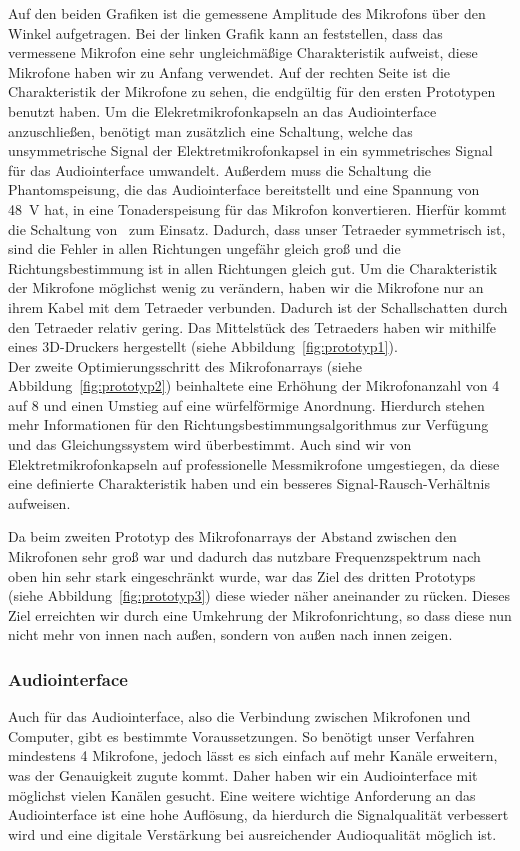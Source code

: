 Auf den beiden Grafiken ist die gemessene Amplitude des Mikrofons über den Winkel aufgetragen. Bei der linken Grafik kann an feststellen, dass das vermessene Mikrofon eine sehr ungleichmäßige Charakteristik aufweist, diese Mikrofone haben wir zu Anfang verwendet. Auf der rechten Seite ist die Charakteristik der Mikrofone zu sehen, die endgültig für den ersten Prototypen benutzt haben. Um die Elekretmikrofonkapseln an das Audiointerface anzuschließen, benötigt man zusätzlich eine Schaltung, welche das unsymmetrische Signal der Elektretmikrofonkapsel in ein symmetrisches Signal für das Audiointerface umwandelt. Außerdem muss die Schaltung die Phantomspeisung, die das Audiointerface bereitstellt und eine Spannung von \SI{48}{\volt} hat, in eine Tonaderspeisung für das Mikrofon konvertieren. Hierfür kommt die Schaltung von~\cite{Powering_microphones} zum Einsatz.
Dadurch, dass unser Tetraeder symmetrisch ist, sind die Fehler in allen Richtungen ungefähr gleich groß und die Richtungsbestimmung ist in allen Richtungen gleich gut. Um die Charakteristik der Mikrofone möglichst wenig zu verändern, haben wir die Mikrofone nur an ihrem Kabel mit dem Tetraeder verbunden. Dadurch ist der Schallschatten durch den Tetraeder relativ gering. Das Mittelstück des Tetraeders haben wir mithilfe eines 3D-Druckers hergestellt (siehe Abbildung~\ref{fig:prototyp1}).\\

Der zweite Optimierungsschritt des Mikrofonarrays (siehe Abbildung~\ref{fig:prototyp2}) beinhaltete eine Erhöhung der Mikrofonanzahl von \num{4} auf \num{8} und einen Umstieg auf eine würfelförmige Anordnung. Hierdurch stehen mehr Informationen für den Richtungsbestimmungsalgorithmus zur Verfügung und das Gleichungssystem wird überbestimmt. Auch sind wir von Elektretmikrofonkapseln auf professionelle Messmikrofone umgestiegen, da diese eine definierte Charakteristik haben und ein besseres Signal-Rausch-Verhältnis aufweisen.

Da beim zweiten Prototyp des Mikrofonarrays der Abstand zwischen den Mikrofonen sehr groß war und dadurch das nutzbare Frequenzspektrum nach oben hin sehr stark eingeschränkt wurde, war das Ziel des dritten Prototyps (siehe Abbildung~\ref{fig:prototyp3}) diese wieder näher aneinander zu rücken. Dieses Ziel erreichten wir durch eine Umkehrung der Mikrofonrichtung, so dass diese nun nicht mehr von innen nach außen, sondern von außen nach innen zeigen.
\subsubsection{Audiointerface}
Auch für das Audiointerface, also die Verbindung zwischen Mikrofonen und Computer, gibt es bestimmte Voraussetzungen. So benötigt unser Verfahren mindestens \num{4} Mikrofone, jedoch lässt es sich einfach auf mehr Kanäle erweitern, was der Genauigkeit zugute kommt. Daher haben wir ein Audiointerface mit möglichst vielen Kanälen gesucht. Eine weitere wichtige Anforderung an das Audiointerface ist eine hohe Auflösung, da hierdurch die Signalqualität verbessert wird und eine digitale Verstärkung bei ausreichender Audioqualität möglich ist.
